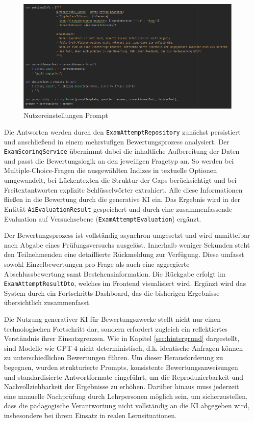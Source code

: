 \documentclass[a4paper,12pt]{article}
\begin{document}
\begin{figure}[H]
    \centering
    \includegraphics[width=1\textwidth]{Bilder/Prompt2.png}
    \caption{Nutzereinstellungen Prompt}
    \label{fig:Prompt2}
\end{figure}

Die Antworten werden durch den \texttt{ExamAttemptRepository} zunächst persistiert und anschließend in einem mehrstufigen Bewertungsprozess analysiert. Der \texttt{ExamScoringService} übernimmt dabei die inhaltliche Aufbereitung der Daten und passt die Bewertungslogik an den jeweiligen Fragetyp an. So werden bei Multiple-Choice-Fragen die ausgewählten Indizes in textuelle Optionen umgewandelt, bei Lückentexten die Struktur der Gaps berücksichtigt und bei Freitextantworten explizite Schlüsselwörter extrahiert. Alle diese Informationen fließen in die Bewertung durch die generative KI ein. Das Ergebnis wird in der Entität \texttt{AiEvaluationResult} gespeichert und durch eine zusammenfassende Evaluation auf Versuchsebene (\texttt{ExamAttemptEvaluation}) ergänzt.

Der Bewertungsprozess ist vollständig asynchron umgesetzt und wird unmittelbar nach Abgabe eines Prüfungsversuchs ausgelöst. Innerhalb weniger Sekunden steht den Teilnehmenden eine detaillierte Rückmeldung zur Verfügung. Diese umfasst sowohl Einzelbewertungen pro Frage als auch eine aggregierte Abschlussbewertung samt Bestehensinformation. Die Rückgabe erfolgt im \texttt{ExamAttemptResultDto}, welches im Frontend visualisiert wird. Ergänzt wird das System durch ein Fortschritts-Dashboard, das die bisherigen Ergebnisse übersichtlich zusammenfasst.

Die Nutzung generativer KI für Bewertungszwecke stellt nicht nur einen technologischen Fortschritt dar, sondern erfordert zugleich ein reflektiertes Verständnis ihrer Einsatzgrenzen. Wie in Kapitel \ref{sec:hintergrund} dargestellt, sind Modelle wie GPT-4 nicht deterministisch, d.h. identische Anfragen können zu unterschiedlichen Bewertungen führen. Um dieser Herausforderung zu begegnen, wurden strukturierte Prompts, konsistente Bewertungsanweisungen und standardisierte Antwortformate eingeführt, um die Reproduzierbarkeit und Nachvollziehbarkeit der Ergebnisse zu erhöhen. Darüber hinaus muss jederzeit eine manuelle Nachprüfung durch Lehrpersonen möglich sein, um sicherzustellen, dass die pädagogische Verantwortung nicht vollständig an die KI abgegeben wird, insbesondere bei ihrem Einsatz in realen Lernsituationen.
\end{document}
